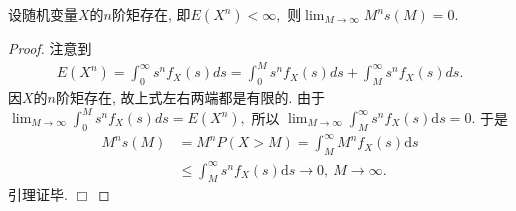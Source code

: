 \documentclass[a4paper,openany, 10pt]{ctexbook}
\def\qed{\hfill$\Box$\medskip}
\def\rto{\rightarrow\infty}
\def\no{\nonumber}
\begin{document}
\begin{lemma}\label{lemm0}
    设随机变量$X$的$n$阶矩存在, 即$E(X^n) < \infty,$ 则$\lim_{M \rightarrow \infty}M^ns(M) = 0.$
\end{lemma}
\begin{proof} 注意到
    \begin{align}
        E(X^n)=\int_{0}^\infty s^n f_X(s)ds=\int_0^Ms^n f_X(s)ds +\int_{M}^\infty s^n f_X(s)ds.
    \end{align}
    因$X$的$n$阶矩存在, 故上式左右两端都是有限的. 由于 $\lim_{M\rto} \int_0^Ms^n f_X(s)ds=E(X^n),$ 所以
    $\lim_{M\rto}\int_{M}^{\infty} s^nf_X(s)\mathrm{d}s=0.$ 于是
    \begin{align}
        M^n s(M) & = M^nP(X>M)
        =    \int_{M}^{\infty} M^nf_X(s)\mathrm{d}s  \no                                 \\
                 & \leq \int_{M}^{\infty} s^nf_X(s)\mathrm{d}s \rightarrow 0,\ M\rto.\no
    \end{align}
    引理证毕. \qed
\end{proof}
\end{document}
